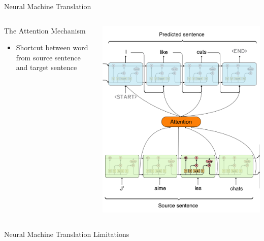 \documentclass[aspectratio=169]{beamer}
\begin{document}
\begin{frame}{Neural Machine Translation}
\begin{columns}
\begin{column}{0.5\textwidth}
   The Attention Mechanism
   \begin{itemize}
   	\item Shortcut between word from source sentence and target sentence
   \end{itemize}
\end{column}
\begin{column}{0.5\textwidth}  %
    \begin{center}
    \vspace{-1.3cm}
    \includegraphics[width=\textwidth]{figures/seq2seq_attn}
    \end{center}
\end{column}
\end{columns}
\end{frame}

\begin{frame}{Neural Machine Translation}
Limitations
\end{frame}
\end{document}
